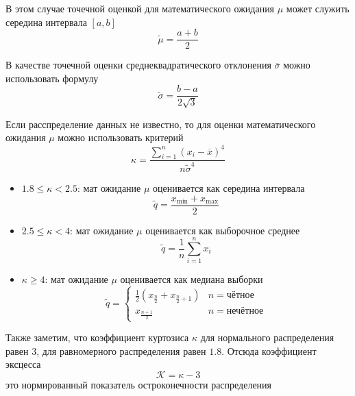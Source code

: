 \documentclass[12pt,a4paper]{article}
\begin{document}
В этом случае точечной оценкой для математического ожидания $\mu$ может служить 
середина интервала $[a, b]$
\begin{equation}
\tilde{\mu} = \frac{a + b}{2}
\tag{1.6}
\end{equation}

В качестве точечной оценки среднеквадратического отклонения $\overline{\sigma}$ можно 
использовать формулу
\begin{equation}
\tilde{\sigma} = \frac{b - a}{2\sqrt{3}}
\tag{1.7}
\end{equation}

Если расспределение данных не известно, то для оценки математического ожидания $\mu$ 
можно использовать критерий 
\begin{equation}
  \kappa = \frac{\displaystyle\sum_{i=1}^{n} (x_i - \overline{x})^4}{n\tilde{\sigma}^4}
\tag{1.8}
\label{kurtosis}
\end{equation}

\begin{itemize}
  \item $1.8 \le \kappa < 2.5$: мат ожидание $\mu$ оценивается как середина интервала
  \begin{equation*}
    \tilde{q} = \frac{x_{\min} + x_{\max}}{2} 
  \end{equation*}
  \item $2.5 \le \kappa < 4$: мат ожидание $\mu$ оценивается как выборочное среднее
  \begin{equation*}
    \tilde{q} = \frac{1}{n} \sum_{i=1}^{n} x_i 
  \end{equation*}
  \item $\kappa \ge 4$: мат ожидание $\mu$ оценивается как медиана выборки
  \begin{equation*}
    \tilde{q} = \begin{cases}
      \frac{1}{2}\left(x_{\frac{n}{2}} + x_{\frac{n}{2} + 1}\right) & n = \text{чётное} \\
      x_{\frac{n+1}{2}} & n = \text{нечётное}
    \end{cases}
  \end{equation*}
\end{itemize}

Также заметим, что коэффициент куртозиса $\kappa$ для нормального распределения равен 
$3$, для равномерного распределения равен $1.8$. Отсюда коэффициент эксцесса  
\begin{equation}
  \mathcal{K} = \kappa - 3
  \tag{1.9}
\end{equation}
это нормированный показатель остроконечности распределения
\end{document}
